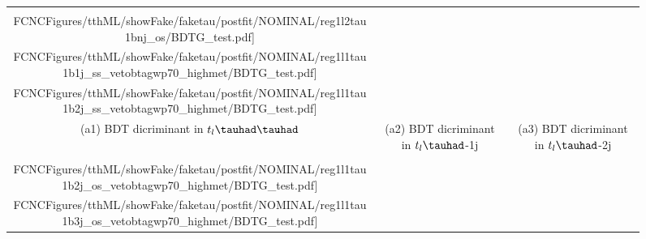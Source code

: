 \begin{figure}[H]
\centering
\begin{tabular}{@{}ccc@{}}
  \texttt{[image: \\FCNCFigures/tthML/showFake/faketau/postfit/NOMINAL/reg1l2tau1bnj\_os/BDTG\_test.pdf]}&
  \texttt{[image: \\FCNCFigures/tthML/showFake/faketau/postfit/NOMINAL/reg1l1tau1b1j\_ss\_vetobtagwp70\_highmet/BDTG\_test.pdf]}&
  \texttt{[image: \\FCNCFigures/tthML/showFake/faketau/postfit/NOMINAL/reg1l1tau1b2j\_ss\_vetobtagwp70\_highmet/BDTG\_test.pdf]}\\
(a1) BDT dicriminant in $t_l\thadhad$ & (a2) BDT dicriminant in  $t_l\tauhad$-1j& (a3) BDT dicriminant in $t_l\tauhad$-2j\\
  \texttt{[image: \\FCNCFigures/tthML/showFake/faketau/postfit/NOMINAL/reg1l1tau1b2j\_os\_vetobtagwp70\_highmet/BDTG\_test.pdf]}&
  \texttt{[image: \\FCNCFigures/tthML/showFake/faketau/postfit/NOMINAL/reg1l1tau1b3j\_os\_vetobtagwp70\_highmet/BDTG\_test.pdf]}&

\end{tabular}
\end{figure}
